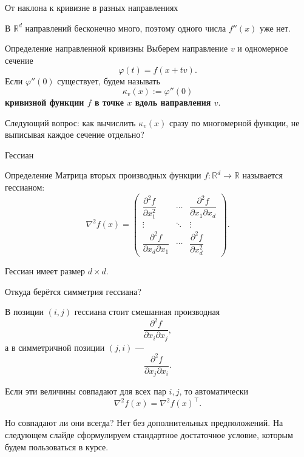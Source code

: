 \documentclass[aspectratio=169,10pt]{beamer}
\newcommand{\R}{\mathbb{R}}
\newcommand{\Hess}{\nabla^2}
\begin{document}
\begin{frame}{От наклона к кривизне в разных направлениях}
\vspace{0.25em}

В $\R^d$ направлений бесконечно много, поэтому одного числа $f''(x)$ уже нет.

\begin{block}{Определение направленной кривизны}
Выберем направление $v$ и одномерное сечение
\[
  \varphi(t)=f(x+tv).
\]
Если $\varphi''(0)$ существует, будем называть
\[
  \boxed{\kappa_v(x):=\varphi''(0)}
\]
\textbf{кривизной функции $f$ в точке $x$ вдоль направления $v$}.
\end{block}

\small
Следующий вопрос: как вычислить $\kappa_v(x)$ сразу по многомерной функции, не выписывая каждое сечение отдельно?
\end{frame}


\begin{frame}{Гессиан}
\vspace{0.35em}

\begin{block}{Определение}
Матрица вторых производных функции $f:\R^d\to\R$ называется гессианом:
\[
\boxed{
\Hess f(x)=
\begin{pmatrix}
\dfrac{\partial^2 f}{\partial x_1^2} & \cdots & \dfrac{\partial^2 f}{\partial x_1\partial x_d}\\[0.8em]
\vdots & \ddots & \vdots\\[0.4em]
\dfrac{\partial^2 f}{\partial x_d\partial x_1} & \cdots & \dfrac{\partial^2 f}{\partial x_d^2}
\end{pmatrix}.
}
\]
\end{block}

\small
Гессиан имеет размер $d\times d$.

\end{frame}

\begin{frame}{Откуда берётся симметрия гессиана?}
\vspace{0.45em}

В позиции $(i,j)$ гессиана стоит смешанная производная
\[
  \frac{\partial^2 f}{\partial x_i\partial x_j},
\]
а в симметричной позиции $(j,i)$ ---
\[
  \frac{\partial^2 f}{\partial x_j\partial x_i}.
\]

Если эти величины совпадают для всех пар $i,j$, то автоматически
\[
  \Hess f(x)=\Hess f(x)^\top.
\]

\begin{alertblock}{Но совпадают ли они всегда?}
Нет без дополнительных предположений. На следующем слайде сформулируем стандартное достаточное условие, которым будем пользоваться в курсе.
\end{alertblock}

\end{frame}
\end{document}
